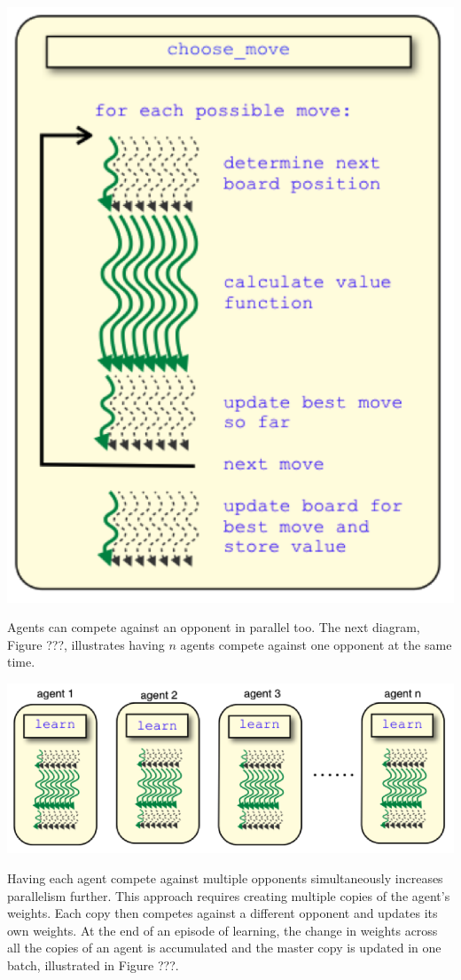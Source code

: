 \documentclass[11pt]{article} %
\begin{document}
\includegraphics[scale=0.8]{fig14}
\begin{flushleft}


Agents can compete against an opponent in parallel too.  The next diagram, Figure ???, illustrates having $n$ agents compete against one opponent at the same time.

\end{flushleft}
\center
\includegraphics[scale=0.8]{fig15}
\begin{flushleft}

Having each agent compete against multiple opponents simultaneously increases parallelism further.  This approach requires creating multiple copies of the agent’s weights.  Each copy then competes against a different opponent and updates its own weights.  At the end of an episode of learning, the change in weights across all the copies of an agent is accumulated and the master copy is updated in one batch, illustrated in Figure ???.

\end{flushleft}
\end{document}
